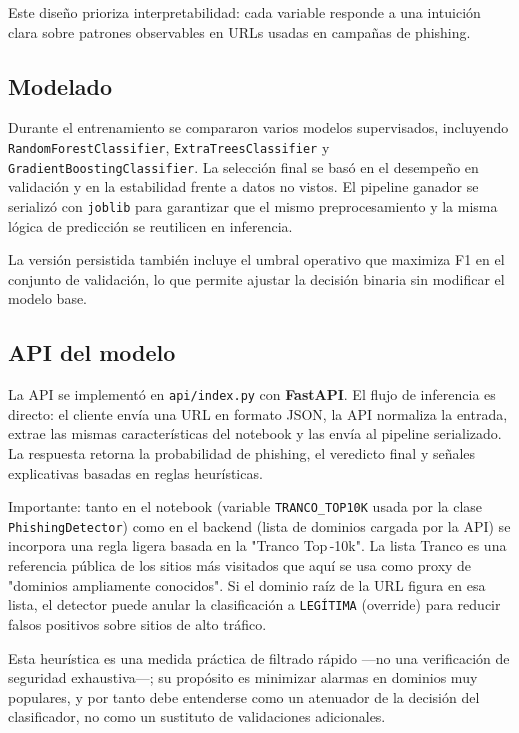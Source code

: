 \documentclass[conference]{IEEEtran}
\begin{document}
Este diseño prioriza interpretabilidad: cada variable responde a una intuición clara sobre patrones observables en URLs usadas en campañas de phishing.

\subsection{Modelado}
Durante el entrenamiento se compararon varios modelos supervisados, incluyendo \texttt{RandomForestClassifier}, \texttt{ExtraTreesClassifier} y \texttt{GradientBoostingClassifier}. La selección final se basó en el desempeño en validación y en la estabilidad frente a datos no vistos. El pipeline ganador se serializó con \texttt{joblib} para garantizar que el mismo preprocesamiento y la misma lógica de predicción se reutilicen en inferencia.

La versión persistida también incluye el umbral operativo que maximiza F1 en el conjunto de validación, lo que permite ajustar la decisión binaria sin modificar el modelo base.

\subsection{API del modelo}
La API se implementó en \texttt{api/index.py} con \textbf{FastAPI}. El flujo de inferencia es directo: el cliente envía una URL en formato JSON, la API normaliza la entrada, extrae las mismas características del notebook y las envía al pipeline serializado. La respuesta retorna la probabilidad de phishing, el veredicto final y señales explicativas basadas en reglas heurísticas.

Importante: tanto en el notebook (variable \texttt{TRANCO\_TOP10K} usada por la clase \texttt{PhishingDetector}) como en el backend (lista de dominios cargada por la API) se incorpora una regla ligera basada en la "Tranco Top\,-10k". La lista Tranco es una referencia pública de los sitios más visitados que aquí se usa como proxy de "dominios ampliamente conocidos". Si el dominio raíz de la URL figura en esa lista, el detector puede anular la clasificación a \texttt{LEGÍTIMA} (override) para reducir falsos positivos sobre sitios de alto tráfico.

Esta heurística es una medida práctica de filtrado rápido —no una verificación de seguridad exhaustiva—; su propósito es minimizar alarmas en dominios muy populares, y por tanto debe entenderse como un atenuador de la decisión del clasificador, no como un sustituto de validaciones adicionales.
\end{document}
